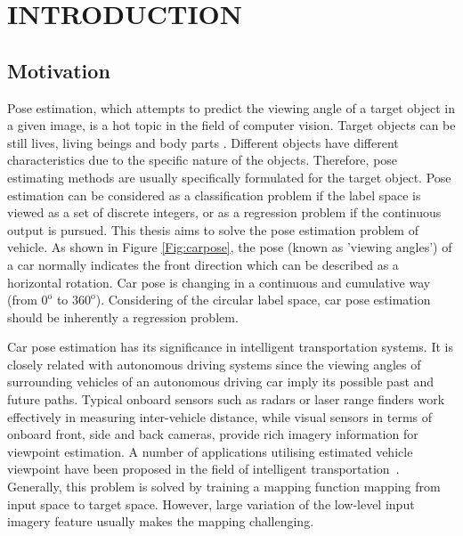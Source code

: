 \documentclass{tutmscthesis}[2010/09/22]
\numberwithin{equation}{section}
\numberwithin{table}{section}
\numberwithin{figure}{section}
\begin{document}
\section{INTRODUCTION}\label{sec:introduction}



\subsection{Motivation}

Pose estimation, which attempts to predict the viewing angle of a target object in a given image, is a hot topic in the field of computer vision. 
Target objects can be still lives, living beings and body parts \cite{dantone2014body, foytik2013two, geng2014cvpr, hara2014growing, HeiChe:2015}. 
Different objects have different characteristics due to the specific nature of the objects. 
Therefore, pose estimating methods are usually specifically formulated for the target object. 
Pose estimation can be considered as a classification problem if the label space is viewed as a set of discrete integers, or as a regression problem if the continuous output is pursued. 
This thesis aims to solve the pose estimation problem of vehicle. 
As shown in Figure \ref{Fig:carpose}, the pose (known as 'viewing angles') of a car normally indicates the front direction which can be described as a horizontal rotation. 
Car pose is changing in a continuous and cumulative way (from $0^\text{o}$ to $360^\text{o}$).
Considering of the circular label space, car pose estimation should be inherently a regression problem.


Car pose estimation has its significance in intelligent transportation systems.
It is closely related with autonomous driving systems since the viewing angles of surrounding vehicles of an autonomous driving car imply its possible past and future paths.
Typical onboard sensors such as radars or laser range finders work effectively in measuring inter-vehicle distance, while visual sensors in terms of onboard front, side and back cameras,  provide rich imagery information for viewpoint estimation.
A number of applications utilising estimated vehicle viewpoint have been proposed in the field of intelligent transportation~\cite{nillson2014transaction,seppa2008transaction,Hongsheng2015transaction,Chi-Chen2008transaction,tongtong2016transaction,shunguang2009transaction}. 
Generally, this problem is solved by training a mapping function mapping from input space to target space. 
However, large variation of the low-level input imagery feature usually makes the mapping challenging. 
\end{document}
